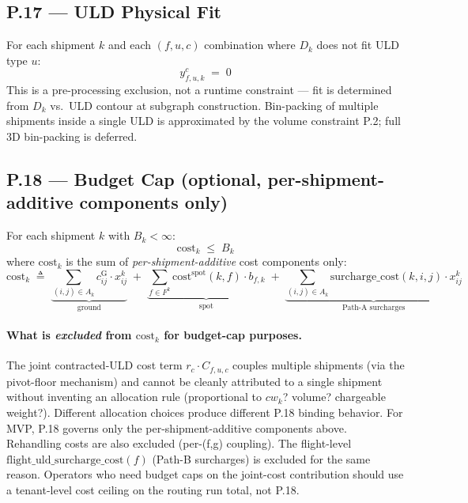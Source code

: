 \documentclass[11pt,a4paper]{article}
\newcommand{\defeq}{\triangleq}
\theoremstyle{definition}
\begin{document}
\subsection*{P.17 — ULD Physical Fit}

For each shipment $k$ and each $(f, u, c)$ combination where $D_k$ does not fit ULD type $u$:
\begin{equation}
  y_{f,u,k}^c \;=\; 0
  \label{eq:P17}
\end{equation}
This is a pre-processing exclusion, not a runtime constraint — fit is determined from
$D_k$ vs.\ ULD contour at subgraph construction. Bin-packing of multiple shipments inside
a single ULD is approximated by the volume constraint P.2; full 3D bin-packing is deferred.

\subsection*{P.18 — Budget Cap (optional, per-shipment-additive components only)}

For each shipment $k$ with $B_k < \infty$:
\begin{equation}
  \text{cost}_k \;\leq\; B_k
  \label{eq:P18}
\end{equation}
where $\text{cost}_k$ is the sum of \emph{per-shipment-additive} cost components only:
\begin{equation}
  \text{cost}_k \;\defeq\;
    \underbrace{\sum_{(i,j) \in A_k} c_{ij}^{\text{G}} \cdot x_{ij}^k}_{\text{ground}}
    \;+\;
    \underbrace{\sum_{f \in F^k} \text{cost}^{\text{spot}}(k, f) \cdot b_{f,k}}_{\text{spot}}
    \;+\;
    \underbrace{\sum_{(i,j) \in A_k} \text{surcharge\_cost}(k, i, j) \cdot x_{ij}^k}_{\text{Path-A surcharges}}
  \label{eq:cost-k-def}
\end{equation}

\paragraph{What is \emph{excluded} from $\text{cost}_k$ for budget-cap purposes.}
The joint contracted-ULD cost term $r_c \cdot C_{f,u,c}$ couples multiple shipments
(via the pivot-floor mechanism) and cannot be cleanly attributed to a single shipment
without inventing an allocation rule (proportional to $cw_k$? volume? chargeable
weight?). Different allocation choices produce different P.18 binding behavior.
For MVP, P.18 governs only the per-shipment-additive components above. Rehandling
costs are also excluded (per-(f,g) coupling). The flight-level
$\text{flight\_uld\_surcharge\_cost}(f)$ (Path-B surcharges) is excluded for the
same reason. Operators who need budget caps on the joint-cost contribution should
use a tenant-level cost ceiling on the routing run total, not P.18.
\end{document}
